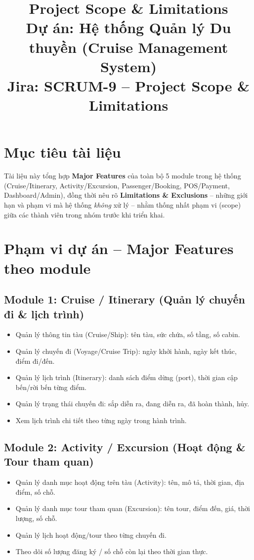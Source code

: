 \documentclass[a4paper,11pt]{article}
\title{\textbf{Project Scope \& Limitations}\\[4pt]
\large Dự án: Hệ thống Quản lý Du thuyền (Cruise Management System)\\
\normalsize Jira: SCRUM-9 -- Project Scope \& Limitations}
\author{}
\date{}
\begin{document}
\maketitle
\vspace{-1.5cm}
\tableofcontents
\vspace{0.5cm}

\section{Mục tiêu tài liệu}

Tài liệu này tổng hợp \textbf{Major Features} của toàn bộ 5 module trong hệ thống (Cruise/Itinerary, Activity/Excursion, Passenger/Booking, POS/Payment, Dashboard/Admin), đồng thời nêu rõ \textbf{Limitations \& Exclusions} -- những giới hạn và phạm vi mà hệ thống \emph{không} xử lý -- nhằm thống nhất phạm vi (scope) giữa các thành viên trong nhóm trước khi triển khai.

\section{Phạm vi dự án -- Major Features theo module}

\subsection{Module 1: Cruise / Itinerary (Quản lý chuyến đi \& lịch trình)}

\begin{itemize}[leftmargin=1.2cm]
  \item Quản lý thông tin tàu (Cruise/Ship): tên tàu, sức chứa, số tầng, số cabin.
  \item Quản lý chuyến đi (Voyage/Cruise Trip): ngày khởi hành, ngày kết thúc, điểm đi/đến.
  \item Quản lý lịch trình (Itinerary): danh sách điểm dừng (port), thời gian cập bến/rời bến từng điểm.
  \item Quản lý trạng thái chuyến đi: sắp diễn ra, đang diễn ra, đã hoàn thành, hủy.
  \item Xem lịch trình chi tiết theo từng ngày trong hành trình.
\end{itemize}

\subsection{Module 2: Activity / Excursion (Hoạt động \& Tour tham quan)}

\begin{itemize}[leftmargin=1.2cm]
  \item Quản lý danh mục hoạt động trên tàu (Activity): tên, mô tả, thời gian, địa điểm, số chỗ.
  \item Quản lý danh mục tour tham quan (Excursion): tên tour, điểm đến, giá, thời lượng, số chỗ.
  \item Quản lý lịch hoạt động/tour theo từng chuyến đi.
  \item Theo dõi số lượng đăng ký / số chỗ còn lại theo thời gian thực.
\end{itemize}
\end{document}
